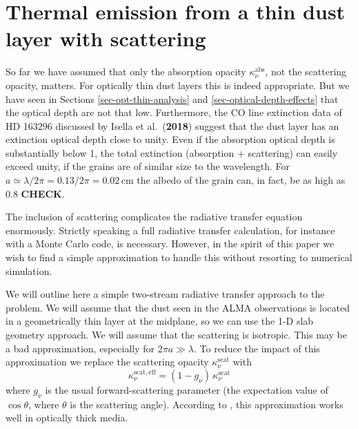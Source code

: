 \documentclass{aa}
\def\paperdsharpisella{Isella et al.\ ({\bf 2018})}
\begin{document}
\section{Thermal emission from a thin dust layer with scattering}
\label{sec-oned-radtrans-model}
%
So far we have assumed that only the absorption opacity
$\kappa_\nu^{\mathrm{abs}}$, not the scattering opacity, matters. For optically
thin dust layers this is indeed appropriate. But we have seen in Sections
\ref{sec-opt-thin-analysis} and \ref{sec-optical-depth-effects} that the
optical depth are not that low. Furthermore, the CO line extinction data
of HD 163296 discussed by \paperdsharpisella{} suggest that the dust
layer has an extinction optical depth close to unity. Even if the absorption
optical depth is substantially below 1, the total extinction (absorption +
scattering) can easily exceed unity, if the grains are of similar size to
the wavelength. For $a\simeq \lambda/2\pi=0.13/2\pi = 0.02\,\mathrm{cm}$ the
albedo of the grain can, in fact, be as high as 0.8 {\bf CHECK}.

The inclusion of scattering complicates the radiative transfer equation
enormously. Strictly speaking a full radiative transfer calculation, for
instance with a Monte Carlo code, is necessary. However, in the spirit of
this paper we wish to find a simple approximation to handle this without
resorting to numerical simulation.

We will outline here a simple two-stream radiative transfer approach to the
problem. We will assume that the dust seen in the ALMA observations is located
in a geometrically thin layer at the midplane, so we can use the 1-D slab
geometry approach. We will assume that the scattering is isotropic. This
may be a bad approximation, especially for $2\pi a\gg \lambda$. To reduce
the impact of this approximation we replace the scattering opacity
$\kappa_\nu^{\mathrm{scat}}$
with
\begin{equation}
\kappa_\nu^{\mathrm{scat,eff}} = (1-g_\nu)\, \kappa_\nu^{\mathrm{scat}}
\end{equation}
where $g_\nu$ is the usual forward-scattering parameter (the expectation
value of $\cos\theta$, where $\theta$ is the scattering angle). According
to \citet{1978wpsr.book.....I}, this approximation works well in
optically thick media.
\end{document}
